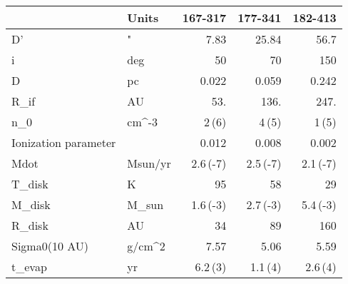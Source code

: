 \begin{tabular}{llrrr}
 & Units & 167-317 & 177-341 & 182-413 \\
\hline
D' & " & 7.83 & 25.84 & 56.7 \\
i & deg & 50 & 70 & 150 \\
D & pc & 0.022 & 0.059 & 0.242 \\
\hline
R_if & AU & 53. & 136. & 247. \\
n_0 & cm^-3 & 2\,(6) & 4\,(5) & 1\,(5) \\
Ionization parameter &  & 0.012 & 0.008 & 0.002 \\
Mdot & Msun/yr & 2.6\,(-7) & 2.5\,(-7) & 2.1\,(-7) \\
\hline
T_disk & K & 95 & 58 & 29 \\
M_disk & M_sun & 1.6\,(-3) & 2.7\,(-3) & 5.4\,(-3) \\
R_disk & AU & 34 & 89 & 160 \\
Sigma0(10 AU) & g/cm^2 & 7.57 & 5.06 & 5.59 \\
t_evap & yr & 6.2\,(3) & 1.1\,(4) & 2.6\,(4) \\
\hline
\end{tabular}
